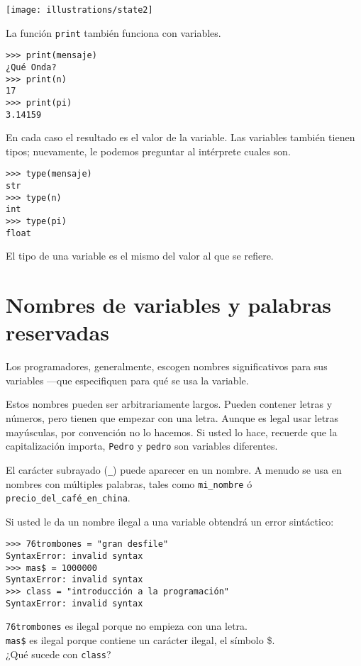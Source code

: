 \beforefig \centerline{\texttt{[image: illustrations/state2]}}
\afterfig

La función \texttt{print} también funciona con variables.

\begin{lstlisting}
>>> print(mensaje)
¿Qué Onda?
>>> print(n)
17
>>> print(pi)
3.14159
\end{lstlisting}
 

En cada caso el resultado es el valor de la variable. Las variables
también tienen tipos; nuevamente, le podemos preguntar al intérprete
cuales son.

\begin{lstlisting}
>>> type(mensaje)
str
>>> type(n)
int
>>> type(pi)
float
\end{lstlisting}
 

El tipo de una variable es el mismo del valor al que se refiere.

\section{Nombres de variables y palabras reservadas}

 

Los programadores, generalmente, escogen nombres significativos para
sus variables —que especifiquen para qué se usa la variable.

Estos nombres pueden ser arbitrariamente largos. Pueden contener letras
y números, pero tienen que empezar con una letra. Aunque es legal
usar letras mayúsculas, por convención no lo hacemos. Si usted lo
hace, recuerde que la capitalización importa, \texttt{Pedro} y \texttt{pedro}
son variables diferentes.

El carácter subrayado (\texttt{\_}) puede aparecer en un nombre. A
menudo se usa en nombres con múltiples palabras, tales como \texttt{mi\_nombre}
ó \texttt{precio\_del\_café\_en\_china}.


Si usted le da un nombre ilegal a una variable obtendrá un error sintáctico:

\begin{lstlisting}
>>> 76trombones = "gran desfile"
SyntaxError: invalid syntax
>>> mas$ = 1000000
SyntaxError: invalid syntax
>>> class = "introducción a la programación"
SyntaxError: invalid syntax
\end{lstlisting}

\texttt{76trombones} es ilegal porque no empieza con una letra.\\
\texttt{mas\$} es ilegal porque contiene un carácter ilegal, el símbolo
\$.\\
¿Qué sucede con \texttt{class}?

